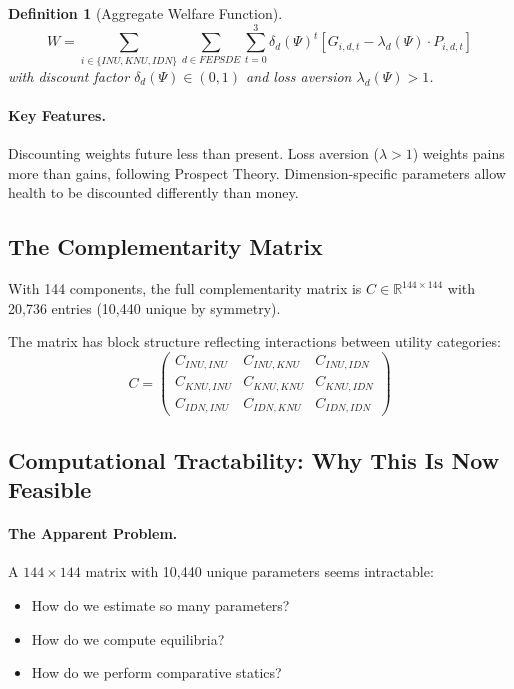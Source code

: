\documentclass[12pt,a4paper]{article}
\newtheorem{definition}[theorem]{Definition}
\begin{document}
\begin{definition}[Aggregate Welfare Function]
\begin{equation}
  W = \sum_{i \in \{INU, KNU, IDN\}} \sum_{d \in FEPSDE} \sum_{t=0}^{3} 
      \delta_d(\Psi)^t \left[ G_{i,d,t} - \lambda_d(\Psi) \cdot P_{i,d,t} \right]
  \label{eq:fullwelfare}
\end{equation}
with discount factor $\delta_d(\Psi) \in (0, 1)$ and loss aversion $\lambda_d(\Psi) > 1$.
\end{definition}

\paragraph{Key Features.}
Discounting weights future less than present.
Loss aversion ($\lambda > 1$) weights pains more than gains, following Prospect Theory.
Dimension-specific parameters allow health to be discounted differently than money.

\subsection{The Complementarity Matrix}

With 144 components, the full complementarity matrix is $C \in \mathbb{R}^{144 \times 144}$
with 20,736 entries (10,440 unique by symmetry).

The matrix has block structure reflecting interactions between utility categories:
\begin{equation}
  C = \begin{pmatrix}
    C_{INU,INU} & C_{INU,KNU} & C_{INU,IDN} \\
    C_{KNU,INU} & C_{KNU,KNU} & C_{KNU,IDN} \\
    C_{IDN,INU} & C_{IDN,KNU} & C_{IDN,IDN}
  \end{pmatrix}
\end{equation}

\subsection{Computational Tractability: Why This Is Now Feasible}

\paragraph{The Apparent Problem.}
A $144 \times 144$ matrix with 10,440 unique parameters seems intractable:
\begin{itemize}
  \item How do we estimate so many parameters?
  \item How do we compute equilibria?
  \item How do we perform comparative statics?
\end{itemize}
\end{document}
